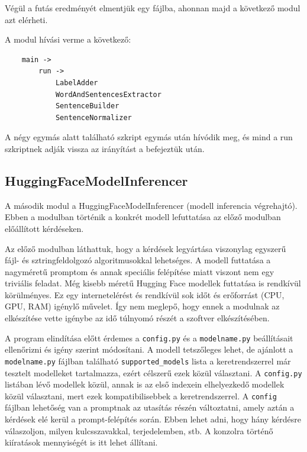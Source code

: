 \documentclass[12pt]{report}
\begin{document}
    Végül a futás eredményét elmentjük egy fájlba, ahonnan majd a következő modul azt elérheti.


    A modul hívási verme a következő:

    \begin{verbatim}
    main ->
        run ->
            LabelAdder
            WordAndSentencesExtractor
            SentenceBuilder
            SentenceNormalizer
    \end{verbatim}

    A négy egymás alatt található szkript egymás után hívódik meg, és mind a run szkriptnek adják vissza az irányítást a befejeztük után.

    \subsection{HuggingFaceModelInferencer}
A második modul a HuggingFaceModelInferencer (modell inferencia végrehajtó).
    Ebben a modulban történik a konkrét modell lefuttatása az előző modulban előállított kérdéseken.

Az előző modulban láthattuk, hogy a kérdések legyártása viszonylag egyszerű fájl- és sztringfeldolgozó algoritmusokkal lehetséges. A modell futtatása a nagyméretű promptom és annak speciális felépítése miatt viszont nem egy triviális feladat. Még kisebb méretű Hugging Face modellek futtatása is rendkívül körülményes. Ez egy internetelérést és rendkívül sok időt és erőforrást (CPU, GPU, RAM) igénylő művelet. Így nem meglepő, hogy ennek a modulnak az elkészítése vette igénybe az idő túlnyomó részét a szoftver elkészítésében.

A program elindítása előtt érdemes a \texttt{\allowbreak config.py} és a \texttt{\allowbreak modelname.py} beállításait ellenőrizni és igény szerint módosítani. A modell tetszőleges lehet, de ajánlott a \texttt{\allowbreak modelname.py} fájlban található \texttt{\allowbreak supported\_models} lista a keretrendszerrel már tesztelt modelleket tartalmazza, ezért célszerű ezek közül választani. A \texttt{\allowbreak config.py} listában lévő modellek közül, annak is az első indexein elhelyezkedő modellek közül választani, mert ezek kompatibilisebbek a keretrendszerrel. A \texttt{\allowbreak config} fájlban lehetőség van a promptnak az utasítás részén változtatni, amely aztán a kérdések elé kerül a prompt-felépítés során. Ebben lehet adni, hogy hány kérdésre válaszoljon, milyen kulcsszavakkal, terjedelemben, stb. A konzolra történő kiíratások mennyiségét is itt lehet állítani.
\end{document}
